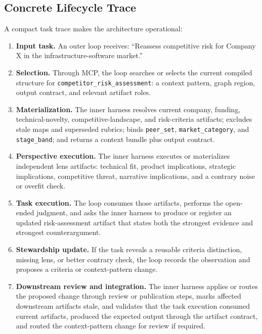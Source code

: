 \documentclass{article}
\begin{document}
\subsection{Concrete Lifecycle Trace}

A compact task trace makes the architecture operational:
\begin{enumerate}[leftmargin=*]
\item \textbf{Input task.} An outer loop receives: ``Reassess competitive risk for Company X in the infrastructure-software market.''
\item \textbf{Selection.} Through MCP, the loop searches or selects the current compiled structure for \texttt{competitor\_risk\_assessment}: a context pattern, graph region, output contract, and relevant artifact roles.
\item \textbf{Materialization.} The inner harness resolves current company, funding, technical-novelty, competitive-landscape, and risk-criteria artifacts; excludes stale maps and superseded rubrics; binds \texttt{peer\_set}, \texttt{market\_category}, and \texttt{stage\_band}; and returns a context bundle plus output contract.
\item \textbf{Perspective execution.} The inner harness executes or materializes independent lens artifacts: technical fit, product implications, strategic implications, competitive threat, narrative implications, and a contrary noise or overfit check.
\item \textbf{Task execution.} The loop consumes those artifacts, performs the open-ended judgment, and asks the inner harness to produce or register an updated risk-assessment artifact that states both the strongest evidence and strongest counterargument.
\item \textbf{Stewardship update.} If the task reveals a reusable criteria distinction, missing lens, or better contrary check, the loop records the observation and proposes a criteria or context-pattern change.
\item \textbf{Downstream review and integration.} The inner harness applies or routes the proposed change through review or publication steps, marks affected downstream artifacts stale, and validates that the task execution consumed current artifacts, produced the expected output through the artifact contract, and routed the context-pattern change for review if required.
\end{enumerate}
\end{document}
